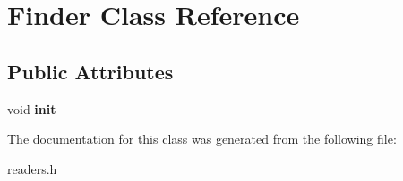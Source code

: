 \hypertarget{classFinder}{\section{\-Finder \-Class \-Reference}
\label{classFinder}
}
\subsection*{\-Public \-Attributes}
\begin{DoxyCompactItemize}
\item 
\hypertarget{classFinder_a749228798dc3ca6b0227a813da62ec24}{void {\bfseries init}}\label{classFinder_a749228798dc3ca6b0227a813da62ec24}

\end{DoxyCompactItemize}


\-The documentation for this class was generated from the following file\-:\begin{DoxyCompactItemize}
\item 
readers.\-h\end{DoxyCompactItemize}
